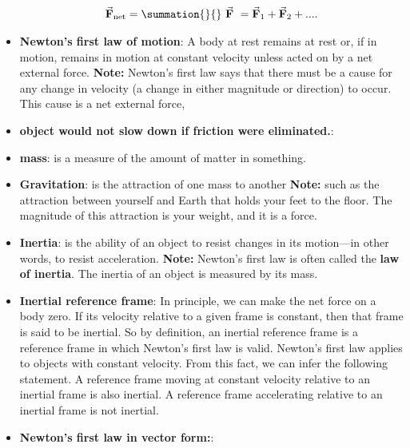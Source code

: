 \documentclass{report}
\begin{document}
\begin{itemize}
                \begin{align*}
                    \vec{\mathbf{F}}_{\text{net}} = \summation{}{}\  \vec{\mathbf{F}}\ = \vec{\mathbf{F}}_{1} + \vec{\mathbf{F}}_{2} + ...
                .\end{align*}
            \item \textbf{Newton's first law of motion}: A body at rest remains at rest or, if in motion, remains in motion at constant velocity unless acted on by a net external force.
                \bigbreak \noindent 
                \textbf{Note:} Newton’s first law says that there must be a cause for any change in velocity (a change in either magnitude or direction) to occur. This cause is a net external force,
            \item \textbf{object would not slow down if friction were eliminated.}:
            \item \textbf{mass}: is a measure of the amount of matter in something.
            \item \textbf{Gravitation}: is the attraction of one mass to another
                \bigbreak \noindent 
                \textbf{Note:} such as the attraction between yourself and Earth that holds your feet to the floor. The magnitude of this attraction is your weight, and it is a force.
            \item \textbf{Inertia}: is the ability of an object to resist changes in its motion—in other words, to resist acceleration.
                \bigbreak \noindent 
                \textbf{Note:} Newton’s first law is often called the \textbf{law of inertia}. The inertia of an object is measured by its mass.
            \item \textbf{Inertial reference frame}: In principle, we can make the net force on a body zero. If its velocity relative to a given frame is constant, then that frame is said to be inertial.
                \bigbreak \noindent 
                So by definition, an inertial reference frame is a reference frame in which Newton’s first law is valid. Newton’s first law applies to objects with constant velocity. From this fact, we can infer the following statement.
                \bigbreak \noindent 
                A reference frame moving at constant velocity relative to an inertial frame is also inertial. A reference frame accelerating relative to an inertial frame is not inertial.
            \item \textbf{Newton’s first law in vector form:}:
                \begin{align*}

\end{align*}
\end{itemize}
\end{document}
